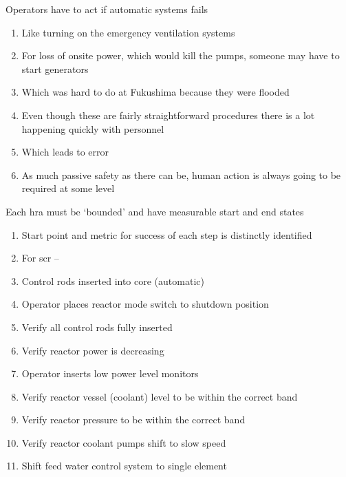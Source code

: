 \documentclass[aspectratio=1610,pdftex,dvipsnames,compress,xcolor={dvipsnames}]{beamer}
\newcommand{\acs}{\acrshort} %
\begin{document}
\begin{frame}{Operators have to act if automatic systems fails}
    \begin{enumerate}[series=outerlist,topsep=0pt,itemsep=21pt,leftmargin=*,label=(\arabic*)]
        \item[]Like turning on the emergency ventilation systems
        \item[]For loss of onsite power, which would kill the pumps, someone may have to start generators
        \item[]Which was hard to do at Fukushima because they were flooded
        \item[]Even though these are fairly straightforward procedures there is a lot happening quickly with personnel
        \item[]Which leads to error
        \item[]As much passive safety as there can be, human action is always going to be required at some level
    \end{enumerate}
\end{frame}


\begin{frame}{Each \acs{hra} must be `bounded' and have measurable start and end states}
    \begin{enumerate}[series=outerlist,topsep=0pt,itemsep=1pt,leftmargin=*,label=(\arabic*)]
        \item[]Start point and metric for success of each step is distinctly identified 
            \vspace{0.10in}
        \item[]For \acs{scr} --
        \item Control rods inserted into core (automatic)
        \item Operator places reactor mode switch to shutdown position
        \item Verify all control rods fully inserted
        \item Verify reactor power is decreasing
        \item Operator inserts low power level monitors
        \item Verify reactor vessel (coolant) level to be within the correct band
        \item Verify reactor pressure to be within the correct band
        \item Verify reactor coolant pumps shift to slow speed
        \item Shift feed water control system to single element
    \end{enumerate}
\end{frame}
\end{document}
